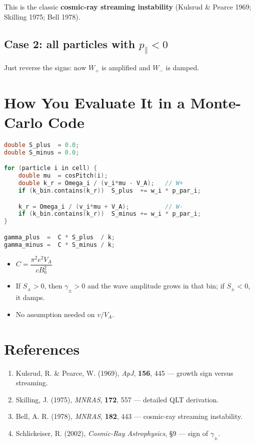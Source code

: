 This is the classic \textbf{cosmic-ray streaming instability} 
(Kulsrud \& Pearce 1969; Skilling 1975; Bell 1978).

\subsection*{Case 2: all particles with $p_\parallel < 0$}

Just reverse the signs: now $W_+$ is amplified and $W_-$ is damped.

\section*{How You Evaluate It in a Monte-Carlo Code}

\begin{lstlisting}[language=C++, basicstyle=\ttfamily\footnotesize]
double S_plus  = 0.0;
double S_minus = 0.0;

for (particle i in cell) {
    double mu  = cosPitch(i);
    double k_r = Omega_i / (v_i*mu - V_A);   // W+
    if (k_bin.contains(k_r))  S_plus  += w_i * p_par_i;

    k_r = Omega_i / (v_i*mu + V_A);          // W-
    if (k_bin.contains(k_r))  S_minus += w_i * p_par_i;
}

gamma_plus  =  C * S_plus  / k;
gamma_minus =  C * S_minus / k;
\end{lstlisting}

\begin{itemize}
  \item $C = \dfrac{\pi^2 e^2 V_A}{c B_0^2}$
  \item If $S_\pm > 0$, then $\gamma_\pm > 0$ and the wave amplitude grows in that bin; if $S_\pm < 0$, it damps.
  \item No assumption needed on $v/V_A$.
\end{itemize}

\section*{References}

\begin{enumerate}
  \item Kulsrud, R. \& Pearce, W. (1969), \emph{ApJ}, \textbf{156}, 445 — growth sign versus streaming.
  \item Skilling, J. (1975), \emph{MNRAS}, \textbf{172}, 557 — detailed QLT derivation.
  \item Bell, A. R. (1978), \emph{MNRAS}, \textbf{182}, 443 — cosmic-ray streaming instability.
  \item Schlickeiser, R. (2002), \emph{Cosmic-Ray Astrophysics}, §9 — sign of $\gamma_\pm$.
\end{enumerate}

